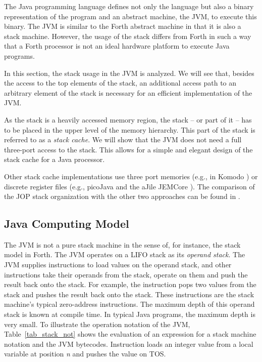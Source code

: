 
The Java programming language defines not only the language but also
a binary representation of the program and an abstract machine, the
JVM, to execute this binary. The JVM is similar to the Forth
abstract machine in that it is also a stack machine. However, the
usage of the stack differs from Forth in such a way that a Forth
processor is not an ideal hardware platform to execute Java
programs.

In this section, the stack usage in the JVM is analyzed. We will see
that, besides the access to the top elements of the stack, an
additional access path to an arbitrary element of the stack is
necessary for an efficient implementation of the JVM.

As the stack is a heavily accessed memory region, the stack -- or
part of it -- has to be placed in the upper level of the memory
hierarchy. This part of the stack is referred to as a \emph{stack
cache}. We will show that the JVM does not need a full three-port
access to the stack. This allows for a simple and elegant design of
the stack cache for a Java processor.

Other stack cache implementations use three port memories (e.g., in
Komodo \cite{komodo2003}) or discrete register files (e.g., picoJava
\cite{pjMicroArch} and the aJile JEMCore \cite{aJile:paper}). The
comparison of the JOP stack organization with the other two
approaches can be found in \cite{jop:stack}.

\subsection{Java Computing Model}

The JVM is not a pure stack machine in the sense of, for instance,
the stack model in Forth. The JVM operates on a LIFO stack as its
\emph{operand stack}. The JVM supplies instructions to load values
on the operand stack, and other instructions take their operands
from the stack, operate on them and push the result back onto the
stack. For example, the  instruction pops two values from
the stack and pushes the result back onto the stack. These
instructions are the stack machine's typical zero-address
instructions. The maximum depth of this operand stack is known at
compile time. In typical Java programs, the maximum depth is very
small. To illustrate the operation notation of the JVM,
Table~\ref{tab_stack_not} shows the evaluation of an expression for
a stack machine notation and the JVM bytecodes. Instruction
 loads an integer value from a local variable at
position \emph{n} and pushes the value on TOS.

